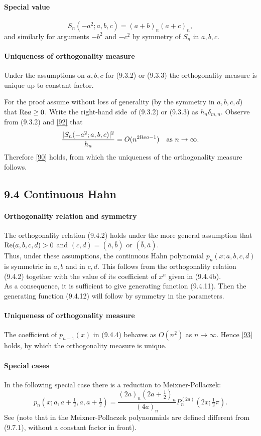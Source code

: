 \documentclass[twoside,11pt]{article}
\newcommand\de\delta
\newcommand\thalf{\tfrac12}
\newcommand\iy\infty
\newcommand\RHS{right-hand side}
\renewcommand\Re{{\rm Re} }
\begin{document}
\paragraph{Special value}
\begin{equation}
S_n(-a^2;a,b,c)=(a+b)_n(a+c)_n ,
\label{92}
\end{equation}
and similarly for arguments $-b^2$ and $-c^2$ by symmetry of $S_n$ in $a,b,c$.
%
\paragraph{Uniqueness of orthogonality measure}
Under the assumptions on $a,b,c$ for (9.3.2) or (9.3.3) the orthogonality
measure is unique up to constant factor.

For the proof assume without
loss of generality (by the symmetry in $a,b,c,d$) that $\Re a\geq0$.
Write the \RHS\ of (9.3.2) or (9.3.3) as $h_n\de_{m,n}$.
Observe from (9.3.2) and \eqref{92} that
\[
\frac{|S_n(-a^2;a,b,c)|^2}{h_n} = O(n^{2\Re a-1})\quad
\hbox{as $n\to\iy$.}
\]
Therefore \eqref{90} holds, from which the uniqueness of the orthogonality
measure follows.
%
\subsection*{9.4 Continuous Hahn}
\label{sec9.4}
%
\paragraph{Orthogonality relation and symmetry}
The orthogonality relation (9.4.2) holds under the more general assumption that
$\Re(a,b,c,d)>0$ and $(c,d)=(\overline a,\overline b)$ or $(\overline b,\overline a)$.\\
Thus, under these assumptions, the continuous Hahn polynomial
$p_n(x;a,b,c,d)$
is symmetric in $a,b$ and in $c,d$.
This follows from the orthogonality relation (9.4.2)
together with the value of its coefficient of $x^n$ given in (9.4.4b).\\
As a consequence, it is sufficient to give generating function (9.4.11). Then the generating
function (9.4.12) will follow by symmetry in the parameters.
%
\paragraph{Uniqueness of orthogonality measure}
The coefficient of $p_{n-1}(x)$ in (9.4.4) behaves as $O(n^2)$ as $n\to\iy$.
Hence \eqref{93} holds, by which the orthogonality measure is unique.
%
\paragraph{Special cases}
In the following special case there is a reduction to
Meixner-Pollaczek:
\begin{equation}
p_n(x;a,a+\thalf,a,a+\thalf)=
\frac{(2a)_n (2a+\thalf)_n}{(4a)_n} P_n^{(2a)}(2x;\thalf\pi).
\end{equation}
See  (note that in  the
Meixner-Pollaczek polynonmials are defined different from (9.7.1),
without a constant factor in front).
\end{document}
